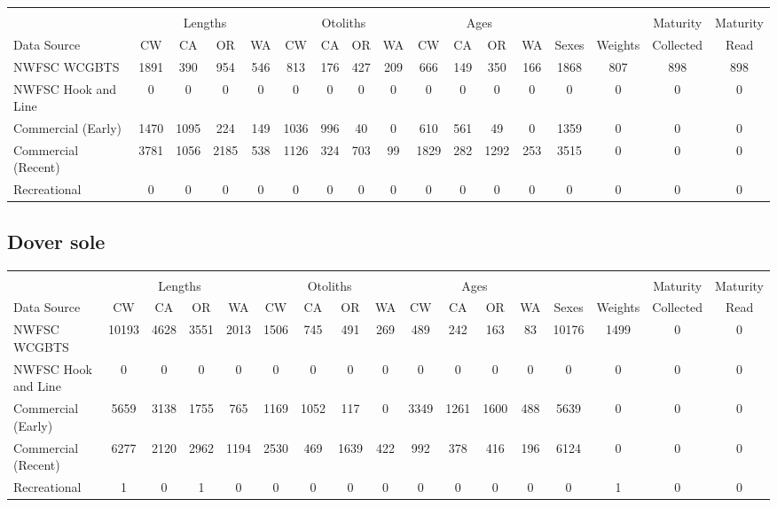 \documentclass[12pt,]{article}
\begin{document}
\begin{table}[ht]
\centering
\begingroup\fontsize{10pt}{10pt}\selectfont
\begin{tabular}{|l|cccc|cccc|cccc|c|c|c|c|}
  \hline
 &  &  &  &  &  &  &  &  &  &  &  &  &  &  &  &  \\ 
   & \multicolumn{4}{c}{Lengths} &  \multicolumn{4}{c}{Otoliths} & \multicolumn{4}{c}{Ages} &  & & Maturity & Maturity\\
 Data Source & CW & CA & OR & WA & CW & CA & OR & WA & CW & CA & OR & WA & Sexes & Weights & Collected & Read\\
 \hline
NWFSC WCGBTS & 1891 & 390 & 954 & 546 & 813 & 176 & 427 & 209 & 666 & 149 & 350 & 166 & 1868 & 807 & 898 & 898 \\ 
  NWFSC Hook and Line & 0 & 0 & 0 & 0 & 0 & 0 & 0 & 0 & 0 & 0 & 0 & 0 & 0 & 0 & 0 & 0 \\ 
  Commercial (Early) & 1470 & 1095 & 224 & 149 & 1036 & 996 & 40 & 0 & 610 & 561 & 49 & 0 & 1359 & 0 & 0 & 0 \\ 
  Commercial (Recent) & 3781 & 1056 & 2185 & 538 & 1126 & 324 & 703 & 99 & 1829 & 282 & 1292 & 253 & 3515 & 0 & 0 & 0 \\ 
  Recreational & 0 & 0 & 0 & 0 & 0 & 0 & 0 & 0 & 0 & 0 & 0 & 0 & 0 & 0 & 0 & 0 \\ 
   \hline
\end{tabular}
\endgroup
\end{table}

\FloatBarrier  

\newpage  

\subsection{Dover sole}\label{dover-sole}

\begin{table}[ht]
\centering
\begingroup\fontsize{10pt}{10pt}\selectfont
\begin{tabular}{|l|cccc|cccc|cccc|c|c|c|c|}
  \hline
 &  &  &  &  &  &  &  &  &  &  &  &  &  &  &  &  \\ 
   & \multicolumn{4}{c}{Lengths} &  \multicolumn{4}{c}{Otoliths} & \multicolumn{4}{c}{Ages} &  & & Maturity & Maturity\\
 Data Source & CW & CA & OR & WA & CW & CA & OR & WA & CW & CA & OR & WA & Sexes & Weights & Collected & Read\\
 \hline
NWFSC WCGBTS & 10193 & 4628 & 3551 & 2013 & 1506 & 745 & 491 & 269 & 489 & 242 & 163 & 83 & 10176 & 1499 & 0 & 0 \\ 
  NWFSC Hook and Line & 0 & 0 & 0 & 0 & 0 & 0 & 0 & 0 & 0 & 0 & 0 & 0 & 0 & 0 & 0 & 0 \\ 
  Commercial (Early) & 5659 & 3138 & 1755 & 765 & 1169 & 1052 & 117 & 0 & 3349 & 1261 & 1600 & 488 & 5639 & 0 & 0 & 0 \\ 
  Commercial (Recent) & 6277 & 2120 & 2962 & 1194 & 2530 & 469 & 1639 & 422 & 992 & 378 & 416 & 196 & 6124 & 0 & 0 & 0 \\ 
  Recreational & 1 & 0 & 1 & 0 & 0 & 0 & 0 & 0 & 0 & 0 & 0 & 0 & 0 & 1 & 0 & 0 \\ 
   \hline
\end{tabular}
\endgroup
\end{table}
\end{document}

